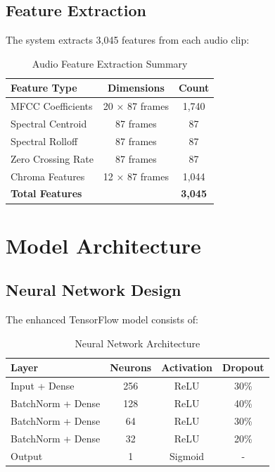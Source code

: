 \documentclass[12pt]{article}
\begin{document}
\subsection{Feature Extraction}
The system extracts 3,045 features from each audio clip:

\begin{table}[H]
\centering
\caption{Audio Feature Extraction Summary}
\begin{tabular}{@{}lcc@{}}
\toprule
\textbf{Feature Type} & \textbf{Dimensions} & \textbf{Count} \\
\midrule
MFCC Coefficients & 20 × 87 frames & 1,740 \\
Spectral Centroid & 87 frames & 87 \\
Spectral Rolloff & 87 frames & 87 \\
Zero Crossing Rate & 87 frames & 87 \\
Chroma Features & 12 × 87 frames & 1,044 \\
\midrule
\textbf{Total Features} & & \textbf{3,045} \\
\bottomrule
\end{tabular}
\end{table}

\section{Model Architecture}

\subsection{Neural Network Design}
The enhanced TensorFlow model consists of:

\begin{table}[H]
\centering
\caption{Neural Network Architecture}
\begin{tabular}{@{}lccc@{}}
\toprule
\textbf{Layer} & \textbf{Neurons} & \textbf{Activation} & \textbf{Dropout} \\
\midrule
Input + Dense & 256 & ReLU & 30\% \\
BatchNorm + Dense & 128 & ReLU & 40\% \\
BatchNorm + Dense & 64 & ReLU & 30\% \\
BatchNorm + Dense & 32 & ReLU & 20\% \\
Output & 1 & Sigmoid & - \\
\bottomrule
\end{tabular}
\end{table}
\end{document}
